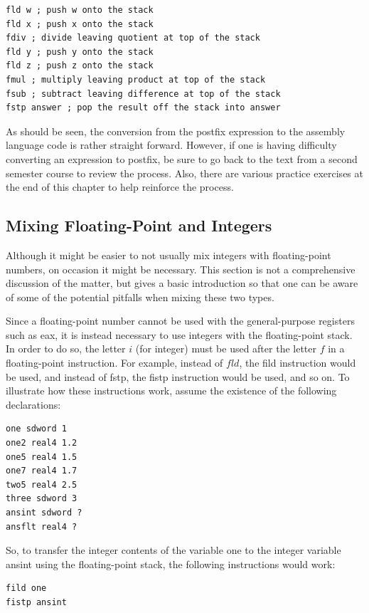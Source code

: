 \documentclass[10pt]{book}
\begin{document}
\begin{verbatim}
fld w ; push w onto the stack
fld x ; push x onto the stack
fdiv ; divide leaving quotient at top of the stack
fld y ; push y onto the stack
fld z ; push z onto the stack
fmul ; multiply leaving product at top of the stack
fsub ; subtract leaving difference at top of the stack
fstp answer ; pop the result off the stack into answer
\end{verbatim}

As should be seen, the conversion from the postfix expression to the assembly language code is rather straight forward. However, if one is having difficulty converting an expression to postfix, be sure to go back to the text from a second semester course to review the process. Also, there are various practice exercises at the end of this chapter to help reinforce the process.

\subsection{Mixing Floating-Point and Integers}
Although it might be easier to not usually mix integers with floating-point numbers, on occasion it might be necessary. This section is not a comprehensive discussion of the matter, but gives a basic introduction so that one can be aware of some of the potential pitfalls when mixing these two types.

Since a floating-point number cannot be used with the general-purpose registers such as eax, it is instead necessary to use integers with the floating-point stack. In order to do so, the letter $i$ (for integer) must be used after the letter $f$ in a floating-point instruction. For example, instead of $f l d$, the fild instruction would be used, and instead of fstp, the fistp instruction would be used, and so on. To illustrate how these instructions work, assume the existence of the following declarations:

\begin{verbatim}
one sdword 1
one2 real4 1.2
one5 real4 1.5
one7 real4 1.7
two5 real4 2.5
three sdword 3
ansint sdword ?
ansflt real4 ?
\end{verbatim}

So, to transfer the integer contents of the variable one to the integer variable ansint using the floating-point stack, the following instructions would work:

\begin{verbatim}
fild one
fistp ansint
\end{verbatim}
\end{document}
